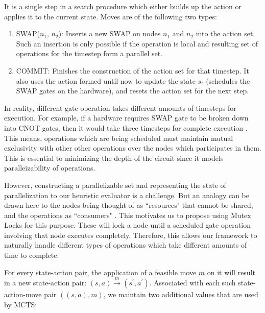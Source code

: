 \documentclass[%
 reprint,
amsmath,amssymb,
pra,
]{revtex4-2}
\begin{document}
\begin{defn}[Move]
    It is a single step in a search procedure which either builds up the action or applies it to the current state. Moves are of the following two types:
    \begin{enumerate}
        \item SWAP($n_1$, $n_2$): Inserts a new SWAP on nodes $n_1$ and $n_2$ into the action set. Such an insertion is only possible if the operation is local and resulting set of operations for the timestep form a parallel set.
        \item COMMIT: Finishes the construction of the action set for that timestep. It also uses the action formed until now to update the state $s_t$ (schedules the SWAP gates on the hardware), and resets the action set for the next step.
    \end{enumerate}
\end{defn}

In reality, different gate operation takes different amounts of timesteps for execution. For example, if a hardware requires SWAP gate to be broken down into CNOT gates, then it would take three timesteps for complete execution \citep{utk_equiv_circuits}. This means, operations which are being scheduled must maintain mutual exclusivity with other other operations over the nodes which participates in them. This is essential to minimizing the depth of the circuit since it models paralleizability of operations.

However, constructing a parallelizable set and representing the state of parallelization to our heuristic evaluator is a challenge. But an analogy can be drawn here to the nodes being thought of as ``resources" that cannot be shared, and the operations as ``consumers" \citep{mutex_dijkstra}. This motivates us to propose using Mutex Locks for this purpose. These will lock a node until a scheduled gate operation involving that node executes completely. Therefore, this allows our framework to naturally handle different types of operations which take different amounts of time to complete.


For every state-action pair, the application of a feasible move $m$ on it will result in a new state-action pair: $(s,a) \xrightarrow[]{m} (s^\prime,a^\prime)$. Associated with each such state-action-move pair $((s, a), m)$, we maintain two additional values that are used by MCTS:
\end{document}
